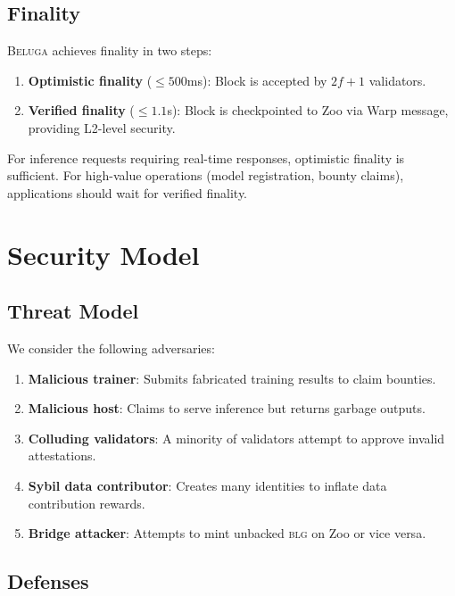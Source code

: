 \documentclass[11pt,letterpaper]{article}
\newcommand{\Beluga}{\textsc{Beluga}}
\newcommand{\BLG}{\textsc{blg}}
\begin{document}
\subsection{Finality}

\Beluga{} achieves finality in two steps:

\begin{enumerate}[nosep]
    \item \textbf{Optimistic finality} ($\leq 500$ms): Block is accepted by $2f+1$ validators.
    \item \textbf{Verified finality} ($\leq 1.1$s): Block is checkpointed to Zoo via Warp message, providing L2-level security.
\end{enumerate}

For inference requests requiring real-time responses, optimistic finality is sufficient. For high-value operations (model registration, bounty claims), applications should wait for verified finality.

\section{Security Model}\label{sec:security}

\subsection{Threat Model}

We consider the following adversaries:

\begin{enumerate}
    \item \textbf{Malicious trainer}: Submits fabricated training results to claim bounties.
    \item \textbf{Malicious host}: Claims to serve inference but returns garbage outputs.
    \item \textbf{Colluding validators}: A minority of validators attempt to approve invalid attestations.
    \item \textbf{Sybil data contributor}: Creates many identities to inflate data contribution rewards.
    \item \textbf{Bridge attacker}: Attempts to mint unbacked \BLG{} on Zoo or vice versa.
\end{enumerate}

\subsection{Defenses}
\end{document}
